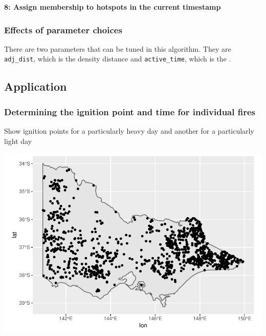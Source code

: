 \textbf{8: Assign membership to hotspots in the current timestamp}

\hypertarget{effects-of-parameter-choices}{%
\subsubsection{Effects of parameter
choices}\label{effects-of-parameter-choices}}

There are two parameters that can be tuned in this algorithm. They are
\texttt{adj\_dist}, which is the density distance and
\texttt{active\_time}, which is the .

\hypertarget{application}{%
\subsection{Application}\label{application}}

\hypertarget{determining-the-ignition-point-and-time-for-individual-fires}{%
\subsubsection{Determining the ignition point and time for individual
fires}\label{determining-the-ignition-point-and-time-for-individual-fires}}

Show ignition points for a particularly heavy day and another for a
particularly light day

\begin{Schunk}

\includegraphics[width=0.8\linewidth]{clustering_paper_files/figure-latex/unnamed-chunk-2-1} \end{Schunk}

